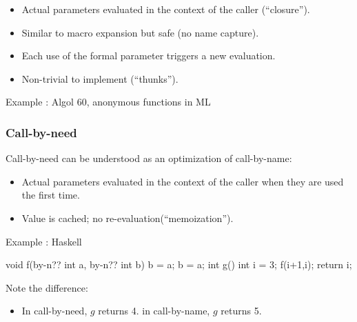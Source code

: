 \documentclass{beamer}
\begin{document}
\begin{frame}[fragile]
\begin{itemize}
\item Actual parameters evaluated in the context of the caller 
(``closure'').
\item Similar to macro expansion but safe (no name capture). 
\item Each use  of the formal parameter triggers a new
evaluation. 
\item Non-trivial to implement (``thunks''). 
\end{itemize}

 Example : Algol 60, anonymous functions in ML
\bigskip

\end{frame}

\begin{frame}[fragile]
\frametitle{Call-by-need}
Call-by-need can be understood as an optimization of
call-by-name:

\begin{itemize}
\item Actual parameters evaluated in the context of the caller
when they are used the first time.
\item Value is cached; no re-evaluation(``memoization''). 
\end{itemize}

 Example : Haskell

\begin{cplus3}

void f(by-n?? int a, by-n?? int b) {
    b = a;
    b = a;
}
int g() {
    int i = 3;
    f(i+1,i);
    return i;
}
\end{cplus3}
Note the difference:
\begin{itemize}
\item In call-by-need, $g$ returns 4.
in call-by-name, $g$ returns 5.

\end{itemize}





\end{frame}
\end{document}
